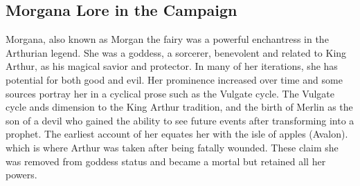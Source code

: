 \subsection{Morgana Lore in the Campaign}

Morgana, also known as Morgan the fairy was a powerful enchantress in the Arthurian legend. She was a goddess, a sorcerer, benevolent and related to King Arthur, as his magical savior and protector. In many of her iterations, she has potential for both good and evil. Her prominence increased over time and some sources portray her in a cyclical prose such as the Vulgate cycle. The Vulgate cycle ands dimension to the King Arthur tradition, and the birth of Merlin as the son of a devil who gained the ability to see future events after transforming into a prophet. The earliest account of her equates her with the isle of apples (Avalon). which is where Arthur was taken after being fatally wounded. These claim she was removed from goddess status and became a mortal but retained all her powers.

 

